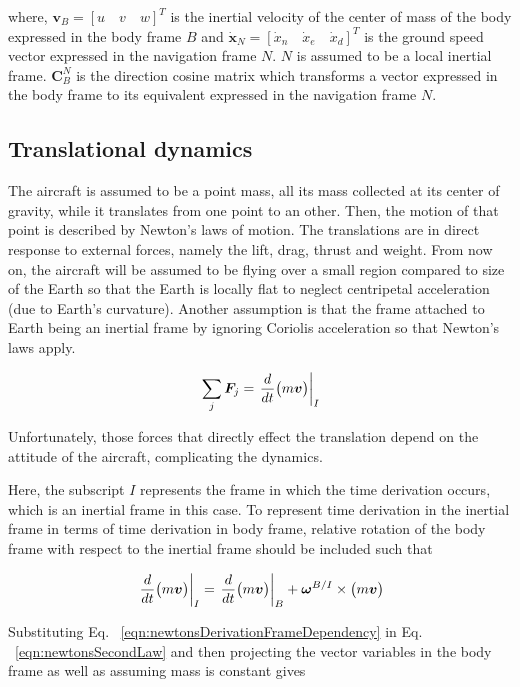 where, $\bm{v}_B = [u \quad v \quad w]^T$ is the inertial velocity of the center of mass of the body expressed in the body frame $B$ and $\dot{\bm{x}}_N = [\dot{x}_n \quad  \dot{x}_e \quad \dot{x}_d]^T$ is the ground speed vector expressed in the navigation frame $N$. $N$ is assumed to be a local inertial frame.
$\bm{C}_B^N$ is the direction cosine matrix which transforms a vector expressed in the body frame to its equivalent expressed in the navigation frame $N$.


\subsection{Translational dynamics}

The aircraft is assumed to be a point mass, all its mass collected at its center of gravity, while it translates from one point to an other.
Then, the motion of that point is described by Newton's laws of motion.
The translations are in direct response to external forces, namely the lift, drag, thrust and weight.
From now on, the aircraft will be assumed to be flying over a small region compared to size of the Earth so that the Earth is locally flat to neglect centripetal acceleration (due to Earth's curvature). 
Another assumption is that the frame attached to Earth being an inertial frame by ignoring Coriolis acceleration so that Newton's laws apply. 

\begin{equation}{\label{eqn:newtonsSecondLaw}}
\sum_j \bm{F}_j = \left. \frac{d}{dt} \big( m \bm{v} \big) \right|_I
\end{equation}

Unfortunately, those forces that directly effect the translation depend on the attitude of the aircraft, complicating the dynamics.

Here, the subscript $I$ represents the frame in which the time derivation occurs, which is an inertial frame in this case. 
To represent time derivation in the inertial frame in terms of time derivation in body frame, relative rotation of the body frame with respect to the inertial frame should be included such that


\begin{equation}{\label{eqn:newtonsDerivationFrameDependency}}
\left. \frac{d}{dt} \big( m \bm{v} \big) \right|_I = \left. \frac{d}{dt} \big( m \bm{v} \big) \right|_B + \bm{\omega}^{B/I} \times \big( m\bm{v} \big)
\end{equation}

Substituting Eq. ~\ref{eqn:newtonsDerivationFrameDependency} in Eq. ~\ref{eqn:newtonsSecondLaw} and then projecting the vector variables in the body frame as well as assuming mass is constant gives



